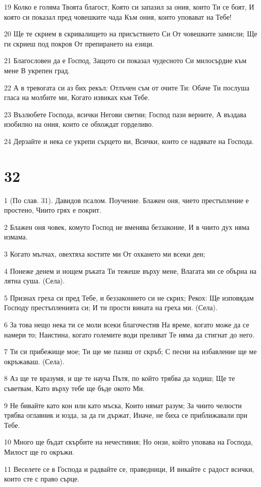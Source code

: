\par 19 Колко е голяма Твоята благост, Която си запазил за ония, които Ти се боят, И която си показал пред човешките чада Към ония, които уповават на Тебе!
\par 20 Ще те скрием в скривалището на присъствието Си От човешките замисли; Ще ги скриеш под покров От препирането на езици.
\par 21 Благословен да е Господ, Защото си показал чудесното Си милосърдие към мене В укрепен град.
\par 22 А в тревогата си аз бих рекъл: Отлъчен съм от очите Ти: Обаче Ти послуша гласа на молбите ми, Когато извиках към Тебе.
\par 23 Възлюбете Господа, всички Негови светии; Господ пази верните, А въздава изобилно на ония, които се обхождат горделиво.
\par 24 Дерзайте и нека се укрепи сърцето ви, Всички, които се надявате на Господа.

\chapter{32}

\par 1 (По слав. 31). Давидов псалом. Поучение. Блажен оня, чието престъпление е простено, Чиито грях е покрит.
\par 2 Блажен оня човек, комуто Господ не вменява беззаконие, И в чиито дух няма измама.
\par 3 Когато мълчах, овехтяха костите ми От охкането ми всеки ден;
\par 4 Понеже денем и нощем ръката Ти тежеше върху мене, Влагата ми се обърна на лятна суша. (Села).
\par 5 Признах греха си пред Тебе, и беззаконието си не скрих; Рекох: Ще изповядам Господу престъпленията си; И ти прости вината на греха ми. (Села).
\par 6 За това нещо нека ти се моли всеки благочестив На време, когато може да се намери то; Наистина, когато големите води преливат Те няма да стигнат до него.
\par 7 Ти си прибежище мое; Ти ще ме пазиш от скръб; С песни на избавление ще ме окръжаваш. (Села).
\par 8 Аз ще те вразумя, и ще те науча Пътя, по който трябва да ходиш; Ще те съветвам, Като върху тебе ще бъде окото Ми.
\par 9 Не бивайте като кон или като мъска, Които нямат разум; За чиито челюсти трябва оглавник и юзда, за да ги държат, Иначе, не биха се приближавали при Тебе.
\par 10 Много ще бъдат скърбите на нечестивия; Но онзи, който уповава на Господа, Милост ще го окръжи.
\par 11 Веселете се в Господа и радвайте се, праведници, И викайте с радост всички, които сте с право сърце.

